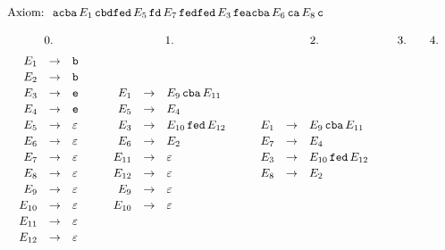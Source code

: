 \documentclass[a4paper,12pt]{article}
\begin{document}
\[
\renewcommand{\arraystretch}{1.15}
\begin{array}{l}
\text{Axiom: }\;
\mathtt{a}\mathtt{c}\mathtt{b}\mathtt{a}\,E_1\,
\mathtt{c}\mathtt{b}\mathtt{d}\mathtt{f}\mathtt{e}\mathtt{d}\,E_5\,
\mathtt{f}\mathtt{d}\,E_7\,
\mathtt{f}\mathtt{e}\mathtt{d}\mathtt{f}\mathtt{e}\mathtt{d}\,E_3\,
\mathtt{f}\mathtt{e}\mathtt{a}\mathtt{c}\mathtt{b}\mathtt{a}\,E_6\,
\mathtt{c}\mathtt{a}\,E_8\,\mathtt{c}
\\[1em]
\begin{array}{c@{\qquad}c@{\qquad}c@{\qquad}c@{\qquad}c}
\text{0.} & \text{1.} & \text{2.} & \text{3.} & \text{4.}
\\[0.4em]
\begin{array}{rcl}
E_1      &\to& \mathtt{b}\\
E_2      &\to& \mathtt{b}\\
E_3      &\to& \mathtt{e}\\
E_4      &\to& \mathtt{e}\\
E_5      &\to& \varepsilon\\
E_6      &\to& \varepsilon\\
E_7      &\to& \varepsilon\\
E_8      &\to& \varepsilon\\
E_9      &\to& \varepsilon\\
E_{10}   &\to& \varepsilon\\
E_{11}   &\to& \varepsilon\\
E_{12}   &\to& \varepsilon
\end{array}
&
\begin{array}{rcl}
E_1      &\to& E_9\,\mathtt{c}\mathtt{b}\mathtt{a}\,E_{11}\\
E_5      &\to& E_4\\
E_3      &\to& E_{10}\,\mathtt{f}\mathtt{e}\mathtt{d}\,E_{12}\\
E_6      &\to& E_2\\
E_{11}   &\to& \varepsilon\\
E_{12}   &\to& \varepsilon\\
E_9      &\to& \varepsilon\\
E_{10}   &\to& \varepsilon
\end{array}
&
\begin{array}{rcl}
E_1      &\to& E_9\,\mathtt{c}\mathtt{b}\mathtt{a}\,E_{11}\\
E_7      &\to& E_4\\
E_3      &\to& E_{10}\,\mathtt{f}\mathtt{e}\mathtt{d}\,E_{12}\\
E_8      &\to& E_2\\

\end{array}
\end{array}
\end{array}\]
\end{document}
